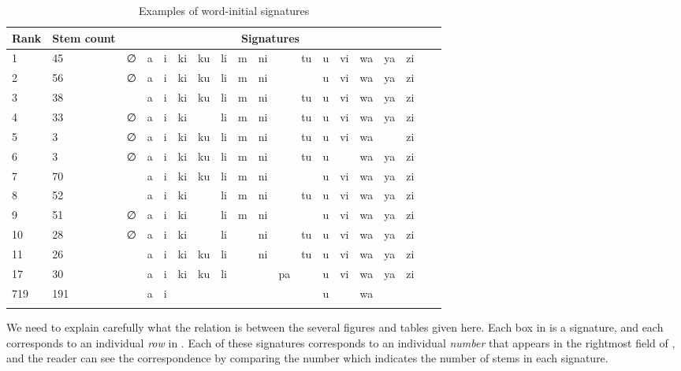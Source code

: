 \documentclass[output=paper,colorlinks,citecolor=brown]{langscibook}
\begin{document}
%
% 
\begin{table}
\begin{tabular}{lllllllllllllllllll}\lsptoprule
Rank& Stem count & \multicolumn{15}{c}{Signatures} \\ \midrule
1 & 45 & ∅ & a &  i &  ki &  ku &  li &  m &  ni  &&  tu &  u &  vi &  wa &  ya &  zi \\
2 & 56 & ∅ & a &  i &  ki &  ku &  li &  m &  ni &   & &  u &  vi &  wa & ya  &  zi   \\
3 & 38 &      & a &  i &  ki &  ku &  li &  m &  ni  &&  tu &  u &  vi &  wa &  ya &  zi \\
4 & 33 &  ∅ & a &  i &  ki &  &  li &  m &  ni &   &  tu &  u &  vi &  wa &  ya &  zi  \\
5 & 3  & ∅ & a &  i &  ki &  ku &  li &  m &  ni &   &  tu &  u &  vi &  wa &    &  zi\\
6 & 3 & ∅ & a &  i &  ki &  ku &  li &  m &  ni &  &  tu &  u &   &  wa &  ya &  zi  \\
7 & 70 &    & a &  i &  ki &  ku &  li &  m &  ni  &&    &  u &  vi &  wa &  ya &  zi  \\
8 & 52 &   & a &  i &  ki &   &  li &  m &  ni &  &  tu  &  u &  vi &  wa &  ya &  zi  \\
9 & 51 & ∅ & a &  i &  ki &   &  li & m &  ni &   &   &  u &  vi &  wa &  ya &  zi\\
10 & 28  & ∅ & a &  i &  ki &   &  li &   & ni  &   &  tu &  u &  vi &  wa &  ya &  zi\\
11 & 26 & & a &  i &  ki & ku  &  li &    &  ni &   &  tu &  u &  vi &  wa &  ya &  zi \\
17 &  30 &  & a &  i &  ki &  ku &  li &   &    & pa &    &  u &  vi &  wa &  ya &  zi \\
719  & 191 && a &i &&&&&&&&u &&wa  \\  \lspbottomrule
\end{tabular}
\caption{Examples of word-initial signatures}
\label{topsigexamples}
\end{table}



  


We need to explain carefully what the relation is between the several figures and tables given here. Each box in  is a signature, and each corresponds to an individual \textit{row} in  . Each of these signatures corresponds to an individual \textit{number} that appears in the rightmost field of  , and the reader can see the correspondence by comparing the number which indicates the number of stems in each signature.
\end{document}
